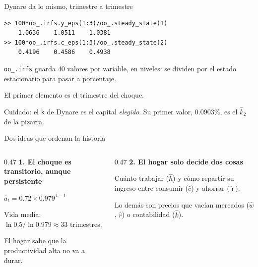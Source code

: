 \begin{frame}[fragile,label=dynare-confirma]{Dynare da lo mismo, trimestre a trimestre}
  \begin{lstlisting}[language={}]
>> 100*oo_.irfs.y_eps(1:3)/oo_.steady_state(1)
    1.0636    1.0511    1.0381
>> 100*oo_.irfs.c_eps(1:3)/oo_.steady_state(2)
    0.4196    0.4586    0.4938
\end{lstlisting}
  \vspace{0.2cm}
  \texttt{oo\_.irfs} guarda 40 valores por variable, en niveles: se dividen por el
  estado estacionario para pasar a porcentaje.\par
  \vspace{0.25cm}
  El primer elemento es el trimestre del choque.\par
  \vspace{0.25cm}
  Cuidado: el \texttt{k} de Dynare es el capital \emph{elegido}. Su primer valor,
  $0.0903\%$, es el $\hat k_2$ de la pizarra.
\end{frame}

\begin{frame}[label=dos-ideas]{Dos ideas que ordenan la historia}
  \begin{columns}[T,onlytextwidth]
    \begin{column}{0.47\textwidth}
      \textbf{1. El choque es transitorio, aunque persistente}\par
      \vspace{0.25cm}
      $\hat a_t=0.72\times0.979^{\,t-1}$\par
      \vspace{0.2cm}
      Vida media: $\ln 0.5/\ln 0.979\approx33$ trimestres.\par
      \vspace{0.2cm}
      El hogar sabe que la productividad alta no va a durar.
    \end{column}
    \begin{column}{0.47\textwidth}
      \textbf{2. El hogar solo decide dos cosas}\par
      \vspace{0.25cm}
      Cuánto trabajar ($\hat h$) y cómo repartir su ingreso entre consumir ($\hat c$) y
      ahorrar ($\hat\imath$).\par
      \vspace{0.2cm}
      Lo demás son precios que vacían mercados ($\hat w$, $\hat r$) o contabilidad
      ($\hat k$).
    \end{column}
  \end{columns}
\end{frame}

